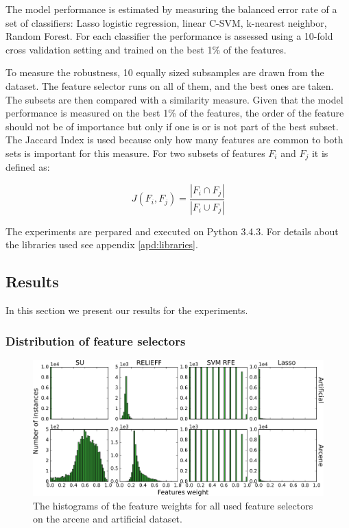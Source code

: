 \documentclass[twoside,11pt]{article}
\begin{document}
The model performance is estimated by measuring the balanced error rate of a set of classifiers: Lasso logistic regression, linear C-SVM, k-nearest neighbor, Random Forest. 
For each classifier the performance is assessed using a 10-fold cross validation setting and trained on the best 1\% of the features.

To measure the robustness, 10 equally sized subsamples are drawn from the dataset. The feature selector runs on all of them, and the best ones are taken. The subsets are then compared with a similarity measure. Given that the model performance is measured on the best 1\% of the features, the order of the feature should not be of importance but only if one is or is not part of the best subset. The Jaccard Index is used because only how many features are common to both sets is important for this measure. For two subsets of features $F_i$ and $F_j$ it is defined as:

\begin{equation}
J(F_i, F_j) = \frac{| F_i \cap F_j |}{| F_i \cup F_j |}
\end{equation}

The experiments are perpared and executed on Python 3.4.3. For details about the libraries used see appendix \ref{apd:libraries}.

\subsection{Results}
In this section we present our results for the experiments. %
\subsubsection{Distribution of feature selectors}
\begin{figure}[h!]
  \centering
    \includegraphics[width=\textwidth]{feature_weights_hist_arcene_artificial.png}
  \caption{The histograms of the feature weights for all used feature selectors on the arcene and artificial dataset.}
  \label{fig:feature_weights_hist_arcene_artificial}
\end{figure}
\end{document}
